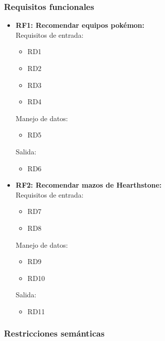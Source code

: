 \subsubsection{Requisitos funcionales}

	\begin{itemize}
		\item \textbf{RF1: Recomendar equipos pokémon:}\\
		Requisitos de entrada:
		\begin{itemize}
			\item RD1
			\item RD2
			\item RD3
			\item RD4
		\end{itemize}
		Manejo de datos:
		\begin{itemize}
			\item RD5
		\end{itemize}
		Salida:
		\begin{itemize}
			\item RD6
		\end{itemize}

		\item \textbf{RF2: Recomendar mazos de Hearthstone:}\\
		Requisitos de entrada:
		\begin{itemize}
			\item RD7 %
			\item RD8 %
		\end{itemize}
		Manejo de datos:
		\begin{itemize}
			\item RD9 %
			\item RD10 %
		\end{itemize}
		Salida:
		\begin{itemize}
			\item RD11 %
		\end{itemize}

	\end{itemize}


\subsubsection{Restricciones semánticas}
